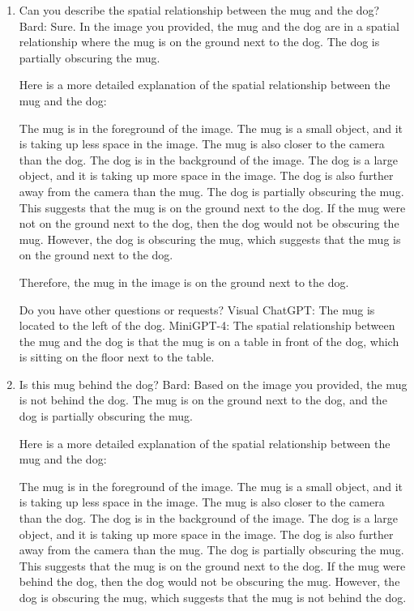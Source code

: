 \begin{enumerate}
    \item Can you describe the spatial relationship between the mug and the dog?
    \subitem Bard: 
    Sure. In the image you provided, the mug and the dog are in a spatial relationship where the mug is on the ground next to the dog. The dog is partially obscuring the mug.
    
    Here is a more detailed explanation of the spatial relationship between the mug and the dog:
    
    The mug is in the foreground of the image. The mug is a small object, and it is taking up less space in the image. The mug is also closer to the camera than the dog.
    The dog is in the background of the image. The dog is a large object, and it is taking up more space in the image. The dog is also further away from the camera than the mug.
    The dog is partially obscuring the mug. This suggests that the mug is on the ground next to the dog.
    If the mug were not on the ground next to the dog, then the dog would not be obscuring the mug. However, the dog is obscuring the mug, which suggests that the mug is on the ground next to the dog.
    
    Therefore, the mug in the image is on the ground next to the dog.
    
    Do you have other questions or requests?
    \subitem Visual ChatGPT: The mug is located to the left of the dog.
    \subitem MiniGPT-4: The spatial relationship between the mug and the dog is that the mug is on a table in front of the dog, which is sitting on the floor next to the table.
    \item Is this mug behind the dog?
    \subitem Bard: 
    Based on the image you provided, the mug is not behind the dog. The mug is on the ground next to the dog, and the dog is partially obscuring the mug.
    
    Here is a more detailed explanation of the spatial relationship between the mug and the dog:
    
    The mug is in the foreground of the image. The mug is a small object, and it is taking up less space in the image. The mug is also closer to the camera than the dog.
    The dog is in the background of the image. The dog is a large object, and it is taking up more space in the image. The dog is also further away from the camera than the mug.
    The dog is partially obscuring the mug. This suggests that the mug is on the ground next to the dog.
    If the mug were behind the dog, then the dog would not be obscuring the mug. However, the dog is obscuring the mug, which suggests that the mug is not behind the dog.
    

\end{enumerate}
